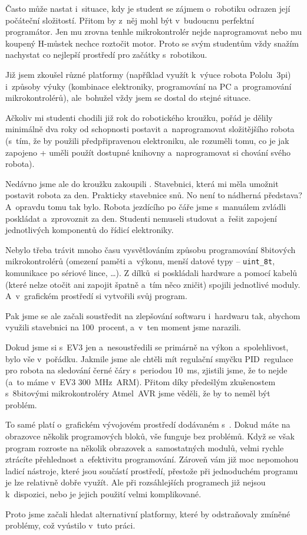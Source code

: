 Často může nastat i~situace, kdy je student se zájmem o~robotiku odrazen její počáteční složitostí.
Přitom by z~něj mohl být v~budoucnu perfektní programátor. 
Jen mu zrovna tenhle mikrokontrolér nejde naprogramovat nebo mu koupený H-můstek nechce roztočit motor.
Proto se svým studentům vždy snažím nachystat co nejlepší prostředí pro začátky s~robotikou. 

Již jsem zkoušel různé platformy (například využít k~výuce robota Pololu~3pi) i~způsoby výuky (kombinace elektroniky, programování na PC a~programování mikrokontrolérů), ale~bohužel vždy jsem se dostal do stejné situace. 

Ačkoliv mi studenti chodili již rok do robotického kroužku, pořád je dělily minimálně dva roky od schopnosti postavit a~naprogramovat složitějšího robota (s~tím, že by použili předpřipravenou elektroniku, ale rozuměli tomu, co je jak zapojeno + uměli použít dostupné knihovny a~naprogramovat si chování svého robota).

Nedávno jsme ale do kroužku zakoupili \legoEV{}. 
Stavebnici, která mi měla umožnit postavit robota za den. 
Prakticky stavebnice snů. No není to nádherná představa?
A~opravdu tomu tak bylo. Robota jezdícího po čáře jsme s~manuálem zvládli poskládat a~zprovoznit za den. 
Studenti nemuseli studovat a~řešit zapojení jednotlivých komponentů do řídicí elektroniky. 

Nebylo třeba trávit mnoho času vysvětlováním způsobu programování 8bitových mikrokontrolérů (omezení paměti a~výkonu, menší datové typy -- \verb|uint_8t|, komunikace po sériové lince, \dots). 
Z dílků~\lega{ }si poskládali hardware a pomocí kabelů (které nelze otočit ani zapojit špatně a~tím něco zničit) spojili jednotlivé moduly. A~v~grafickém prostředí si vytvořili svůj program.


Pak jsme se ale začali soustředit na zlepšování softwaru i~hardwaru tak, abychom využili stavebnici na 100~procent, a~v~ten moment jsme narazili.

Dokud jsme si s~EV3 jen  a~nesoustředili se primárně na výkon a~spolehlivost, bylo vše v~pořádku. 
Jakmile jsme ale chtěli mít regulační smyčku PID~regulace pro robota na sledování černé čáry s~periodou 10~ms, zjistili jsme, že to nejde (a~to máme v~EV3  300~MHz~ARM). Přitom díky předešlým zkušenostem s~8bitovými mikrokontroléry Atmel~AVR jsme věděli, že by to neměl být problém.


To samé platí o~grafickém vývojovém prostředí dodávaném s~\EVthree. Dokud máte na obrazovce několik programových bloků, vše funguje bez problémů. 
Když se však program rozroste na několik obrazovek a~samostatných modulů, velmi rychle ztrácíte přehlednost a~efektivitu programování.
Zároveň vám již moc nepomohou ladicí nástroje, které jsou součástí prostředí, přestože při jednoduchém programu je lze relativně dobře využít. Ale při rozsáhlejších programech již nejsou k~dispozici, nebo je jejich použití velmi komplikované. 


Proto jsme začali hledat alternativní platformy, které by odstraňovaly zmíněné problémy, což vyústilo v~tuto práci.   

